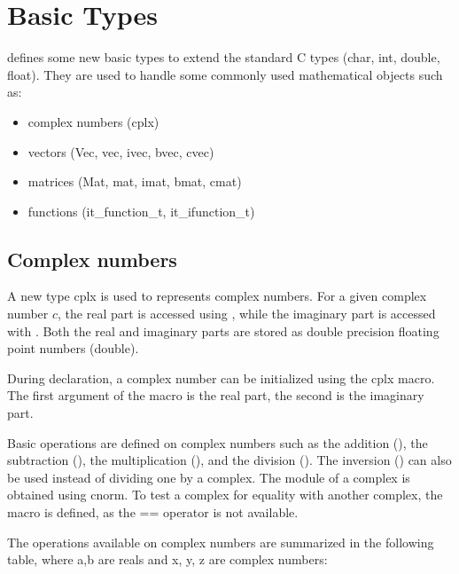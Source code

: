 \chapter{Basic Types}
\label{cha:basictypes}

      \libit defines some new basic types to extend the standard C 
      types (char, int, double, float). They are used to handle
      some commonly used mathematical objects such as:

\begin{itemize}
\item complex numbers (cplx)
\item vectors (Vec, vec, ivec, bvec, cvec)
\item matrices (Mat, mat, imat, bmat, cmat)
\item functions (it\_function\_t, it\_ifunction\_t)
\end{itemize}

\section{Complex numbers}

      A new type cplx is used to represents complex numbers. For a given
      complex number $c$, the real part is accessed using , while the
      imaginary part is accessed with . Both the real and imaginary
      parts are stored as double precision floating point numbers (double).

     During declaration, a complex number can be initialized using the cplx
     macro. The first argument of the macro is the real part, the second is the
     imaginary part.

     Basic operations are defined on complex numbers such as the
     addition (), the subtraction (), the
     multiplication (), and the division
     (). The inversion () can also be used
     instead of dividing one by a complex. The module of a complex is
     obtained using cnorm. To test a complex for equality with another
     complex, the  macro is defined, as the == operator
     is not available.

  The operations available on complex numbers are summarized in the
  following table, where a,b are reals and x, y, z are complex numbers:


